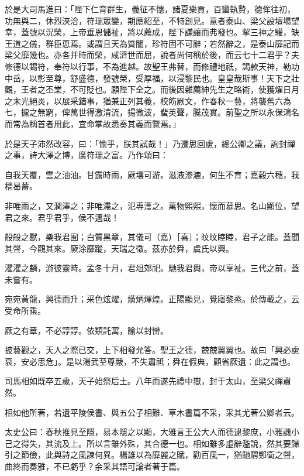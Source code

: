 \begin{pinyinscope}
於是大司馬進曰：「陛下仁育群生，義征不憓，諸夏樂貢，百蠻執贄，德侔往初，功無與二，休烈浹洽，符瑞眾變，期應紹至，不特創見。意者泰山、梁父設壇場望幸，蓋號以況榮，上帝垂恩儲祉，將以薦成，陛下謙讓而弗發也。挈三神之驩，缺王道之儀，群臣恧焉。或謂且天為質闇，珍符固不可辭；若然辭之，是泰山靡記而梁父靡幾也。亦各并時而榮，咸濟世而屈，說者尚何稱於後，而云七十二君乎？夫修德以錫符，奉符以行事，不為進越。故聖王弗替，而修禮地祇，謁款天神，勒功中岳，以彰至尊，舒盛德，發號榮，受厚福，以浸黎民也。皇皇哉斯事！天下之壯觀，王者之丕業，不可貶也。願陛下全之。而後因雜薦紳先生之略術，使獲燿日月之末光絕炎，以展采錯事，猶兼正列其義，校飭厥文，作春秋一藝，將襲舊六為七，攄之無窮，俾萬世得激清流，揚微波，蜚英聲，騰茂實。前聖之所以永保鴻名而常為稱首者用此，宜命掌故悉奏其義而覽焉。」

於是天子沛然改容，曰：「愉乎，朕其試哉！」乃遷思回慮，總公卿之議，詢封禪之事，詩大澤之博，廣符瑞之富。乃作頌曰：

自我天覆，雲之油油。甘露時雨，厥壤可游。滋液滲漉，何生不育；嘉穀六穗，我穡曷蓄。

非唯雨之，又潤澤之；非唯濡之，氾尃濩之。萬物熙熙，懷而慕思。名山顯位，望君之來。君乎君乎，侯不邁哉！

般般之獸，樂我君囿；白質黑章，其儀可（嘉）［喜］；旼旼睦睦，君子之能。蓋聞其聲，今觀其來。厥涂靡蹤，天瑞之徵。茲亦於舜，虞氏以興。

濯濯之麟，游彼靈畤。孟冬十月，君俎郊祀。馳我君輿，帝以享祉。三代之前，蓋未嘗有。

宛宛黃龍，興德而升；采色炫燿，熿炳煇煌。正陽顯見，覺寤黎烝。於傳載之，云受命所乘。

厥之有章，不必諄諄。依類託寓，諭以封巒。

披藝觀之，天人之際已交，上下相發允答。聖王之德，兢兢翼翼也。故曰「興必慮衰，安必思危」。是以湯武至尊嚴，不失肅祗；舜在假典，顧省厥遺：此之謂也。

司馬相如既卒五歲，天子始祭后土。八年而遂先禮中嶽，封于太山，至梁父禪肅然。

相如他所著，若遺平陵侯書、與五公子相難、草木書篇不采，采其尤著公卿者云。

太史公曰：春秋推見至隱，易本隱之以顯，大雅言王公大人而德逮黎庶，小雅譏小己之得失，其流及上。所以言雖外殊，其合德一也。相如雖多虛辭濫說，然其要歸引之節儉，此與詩之風諫何異。楊雄以為靡麗之賦，勸百風一，猶馳騁鄭衛之聲，曲終而奏雅，不已虧乎？余采其語可論者著于篇。


\end{pinyinscope}